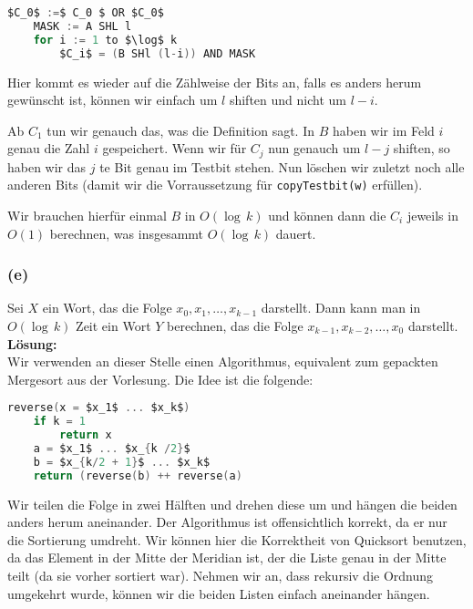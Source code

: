 \documentclass[11pt,a4paper,ngerman]{article}
\begin{document}
\begin{lstlisting}[frame=single,language=C, morekeywords={:=,SHR,SHL,NOT,XOR,AND,OR,MUL}]
	$C_0$ :=$ C_0 $ OR $C_0$
	MASK := A SHL l
	for i := 1 to $\log$ k
		$C_i$ = (B SHl (l-i)) AND MASK
\end{lstlisting}

Hier kommt es wieder auf die Zählweise der Bits an, falls es anders herum gewünscht ist, können wir einfach um $l$ shiften und nicht um $l-i$.

Ab $C_1$ tun wir genauch das, was die Definition sagt. In $B$ haben wir im Feld $i$ genau die Zahl $i$ gespeichert. Wenn wir für $C_j$ nun genauch um $l-j$ shiften, so haben wir das $j$ te Bit genau im Testbit stehen. Nun löschen wir zuletzt noch alle anderen Bits (damit wir die Vorraussetzung für
\lstinline|copyTestbit(w)| erfüllen).

Wir brauchen hierfür einmal $B$ in $O(\log \, k)$ und können dann die $C_i$ jeweils in $O(1)$ berechnen, was insgesammt $O(\log \, k)$ dauert.

\subsubsection*{(e)}
Sei $X$ ein Wort, das die Folge $x_0, x_1, \ldots, x_{k-1}$ darstellt. Dann kann man in $O(\log \, k)$ Zeit ein Wort $Y$ berechnen, das die Folge $x_{k-1}, x_{k-2}, \ldots, x_0$ darstellt.\\

\noindent\textbf{Lösung:}\\

Wir verwenden an dieser Stelle einen Algorithmus, equivalent zum gepackten Mergesort aus der Vorlesung. Die Idee ist die folgende:
\begin{lstlisting}[frame=single,language=C]
reverse(x = $x_1$ ... $x_k$)
	if k = 1
		return x
	a = $x_1$ ... $x_{k /2}$
	b = $x_{k/2 + 1}$ ... $x_k$
	return (reverse(b) ++ reverse(a)
\end{lstlisting}

Wir teilen die Folge in zwei Hälften und drehen diese um und hängen die beiden anders herum aneinander.
Der Algorithmus ist offensichtlich korrekt, da er nur die Sortierung umdreht. Wir können hier die Korrektheit von Quicksort benutzen,
da das Element in der Mitte der Meridian ist, der die Liste genau in der Mitte teilt (da sie vorher sortiert war). Nehmen wir an, dass
rekursiv die Ordnung umgekehrt wurde, können wir die beiden Listen einfach aneinander hängen.\\
\end{document}
